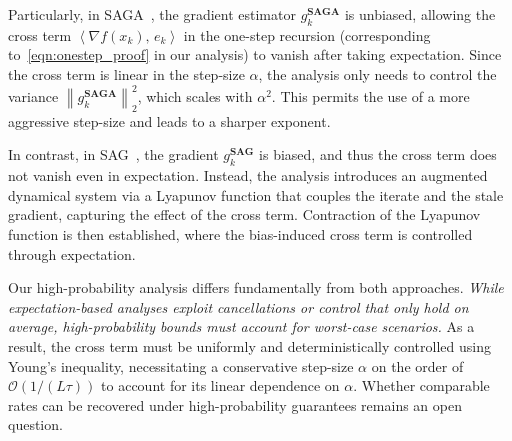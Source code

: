 \documentclass{article}
\theoremstyle{plain}
\theoremstyle{definition}
\newcommand{\cO}{\mathcal{O}}
\newcommand{\iprod}[2]{\left\langle #1,\, #2\right\rangle}
\newcommand{\norm}[1]{\left\| #1\right\|_{2}}
\newcommand{\bigo}[1]{\cO\left( #1\right)}
\newcommand{\bigot}[1]{\tilde\cO\left( #1\right)}
\begin{document}
Particularly, in SAGA~\citep{SAGA}, the gradient estimator $g_k^\textbf{SAGA}$ is unbiased, allowing the cross term $\iprod{\nabla f(x_k)}{e_k}$ in the one-step recursion (corresponding to~\eqref{eqn:onestep_proof} in our analysis) to vanish after taking expectation. Since the cross term is linear in the step-size $\alpha$, the analysis only needs to control the variance $\norm{g_k^\textbf{SAGA}}^2$, which scales with $\alpha^2$. This permits the use of a more aggressive step-size and leads to a sharper exponent. 

In contrast, in SAG~\citep{SAG_proof}, the gradient $g_k^\textbf{SAG}$ is biased, and thus the cross term does not vanish even in expectation. Instead, the analysis introduces an augmented dynamical system via a Lyapunov function that couples the iterate and the stale gradient, capturing the effect of the cross term. Contraction of the Lyapunov function is then established, where the bias-induced cross term is controlled through expectation.

Our high-probability analysis differs fundamentally from both approaches. \textit{While expectation-based analyses exploit cancellations or control that only hold on average, high-probability bounds must account for worst-case scenarios.} As a result, the cross term must be uniformly and deterministically controlled using Young's inequality, necessitating a conservative step-size $\alpha$ on the order of $\bigo{1/(L\tau)}$ to account for its linear dependence on $\alpha$. Whether comparable rates can be recovered under high-probability guarantees remains an open question.
\fi 


\end{document}
